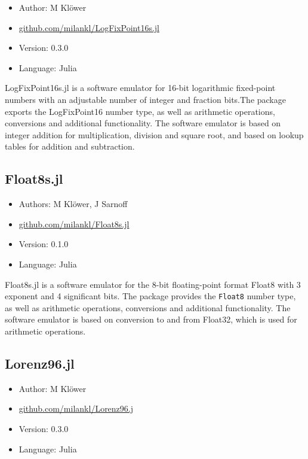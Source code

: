 \begin{itemize}
    \setlength\itemsep{-5pt}
    \item Author: M Klöwer
    \item \href{https://github.com/milankl/LogFixPoint16s.jl}{github.com/milankl/LogFixPoint16s.jl}
    \item Version: 0.3.0
    \item Language: Julia
\end{itemize}

LogFixPoint16s.jl is a software emulator for 16-bit logarithmic fixed-point numbers with an adjustable number of integer and fraction bits.The package exports the
LogFixPoint16 number type, as well as arithmetic operations, conversions and additional functionality. The software emulator is based on integer addition for
multiplication, division and square root, and based on lookup tables for addition and subtraction.

\subsection{Float8s.jl}

\begin{itemize}
    \setlength\itemsep{-5pt}
    \item Authors: M Klöwer, J Sarnoff
    \item \href{https://github.com/milankl/Float8s.jl}{github.com/milankl/Float8s.jl}
    \item Version: 0.1.0
    \item Language: Julia
\end{itemize}

Float8s.jl is a software emulator for the 8-bit floating-point format Float8 with 3 exponent and 4 significant bits. The package provides the \texttt{Float8} number type,
as well as arithmetic operations, conversions and additional functionality. The software emulator is based on conversion to and from Float32, which is used for arithmetic operations.

\subsection{Lorenz96.jl}

\begin{itemize}
    \setlength\itemsep{-5pt}
    \item Author: M Klöwer
    \item \href{https://github.com/milankl/Lorenz96.jl}{github.com/milankl/Lorenz96.j}
    \item Version: 0.3.0
    \item Language: Julia
\end{itemize}


